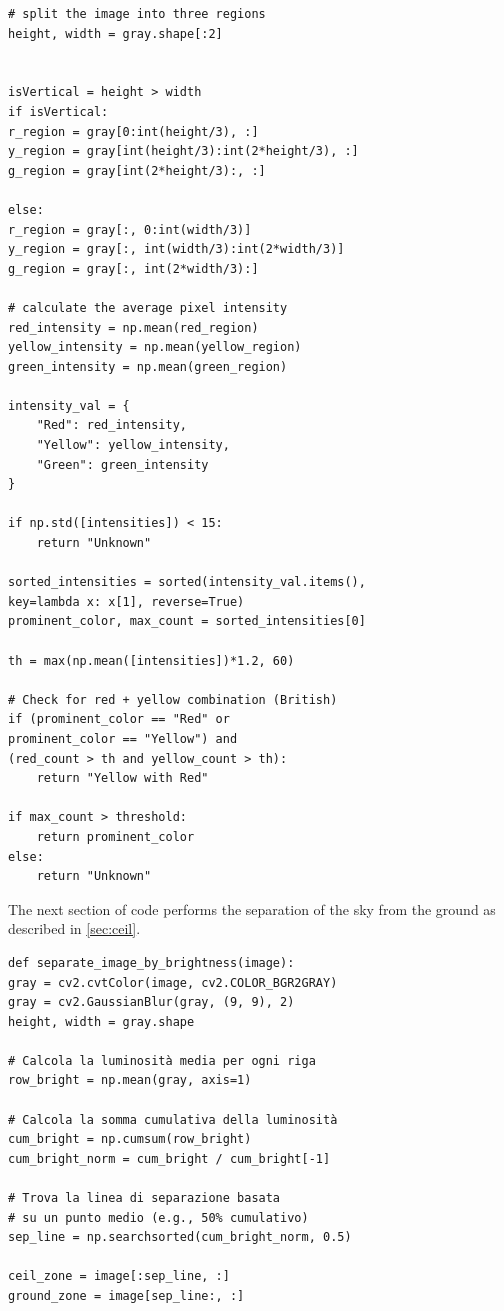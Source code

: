 \documentclass[10pt,conference,a4paper]{IEEEtran}
\begin{document}
\begin{appendices}
\begin{verbatim}
# split the image into three regions
height, width = gray.shape[:2]


isVertical = height > width
if isVertical:
r_region = gray[0:int(height/3), :]
y_region = gray[int(height/3):int(2*height/3), :]
g_region = gray[int(2*height/3):, :]

else:
r_region = gray[:, 0:int(width/3)]
y_region = gray[:, int(width/3):int(2*width/3)]
g_region = gray[:, int(2*width/3):]

# calculate the average pixel intensity
red_intensity = np.mean(red_region)
yellow_intensity = np.mean(yellow_region)
green_intensity = np.mean(green_region)

intensity_val = {
    "Red": red_intensity,
    "Yellow": yellow_intensity,
    "Green": green_intensity
}

if np.std([intensities]) < 15:
    return "Unknown"

sorted_intensities = sorted(intensity_val.items(),
key=lambda x: x[1], reverse=True)
prominent_color, max_count = sorted_intensities[0]

th = max(np.mean([intensities])*1.2, 60)

# Check for red + yellow combination (British)
if (prominent_color == "Red" or 
prominent_color == "Yellow") and 
(red_count > th and yellow_count > th):
    return "Yellow with Red"

if max_count > threshold:
    return prominent_color
else:
    return "Unknown"
\end{verbatim}
\label{lst:trafficlightBW}
The next section of code performs the separation of the sky from the ground as described in \ref{sec:ceil}. 
\begin{verbatim}
def separate_image_by_brightness(image):
gray = cv2.cvtColor(image, cv2.COLOR_BGR2GRAY)
gray = cv2.GaussianBlur(gray, (9, 9), 2)
height, width = gray.shape

# Calcola la luminosità media per ogni riga
row_bright = np.mean(gray, axis=1)

# Calcola la somma cumulativa della luminosità
cum_bright = np.cumsum(row_bright)
cum_bright_norm = cum_bright / cum_bright[-1]

# Trova la linea di separazione basata 
# su un punto medio (e.g., 50% cumulativo)
sep_line = np.searchsorted(cum_bright_norm, 0.5)

ceil_zone = image[:sep_line, :]
ground_zone = image[sep_line:, :]


\end{verbatim}
\end{appendices}
\end{document}
